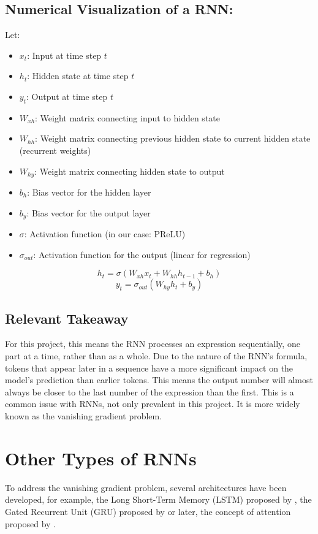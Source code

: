\documentclass{article}
\begin{document}
\subsection{Numerical Visualization of a RNN:}
Let:
\begin{itemize}
    \item $x_t$: Input at time step $t$
    \item $h_t$: Hidden state at time step $t$
    \item $y_t$: Output at time step $t$
    \item $W_{xh}$: Weight matrix connecting input to hidden state
    \item $W_{hh}$: Weight matrix connecting previous hidden state to current hidden state (recurrent weights)
    \item $W_{hy}$: Weight matrix connecting hidden state to output
    \item $b_h$: Bias vector for the hidden layer
    \item $b_y$: Bias vector for the output layer
    \item $\sigma$: Activation function (in our case: PReLU)
    \item $\sigma_{out}$: Activation function for the output (linear for regression)
\end{itemize}

$$h_t = \sigma(W_{xh}x_t + W_{hh}h_{t-1} + b_h)$$
$$y_t = \sigma_{out}(W_{hy}h_t + b_y)$$

\subsection{Relevant Takeaway}
For this project, this means the RNN processes an expression sequentially, one part at a time, rather than as a whole. Due to the nature of the RNN's formula, tokens that appear later in a sequence have a more significant impact on the model's prediction than earlier tokens. This means the output number will almost always be closer to the last number of the expression than the first. This is a common issue with RNNs, not only prevalent in this project. It is more widely known as the vanishing gradient problem.

\section{Other Types of RNNs}
To address the vanishing gradient problem, several architectures have been developed, for example, the Long Short-Term Memory (LSTM) proposed by \cite{6795963}, the Gated Recurrent Unit (GRU) proposed by \cite{cho2014propertiesneuralmachinetranslation} or later, the concept of attention proposed by \cite{bahdanau2016neuralmachinetranslationjointly}.
\end{document}

